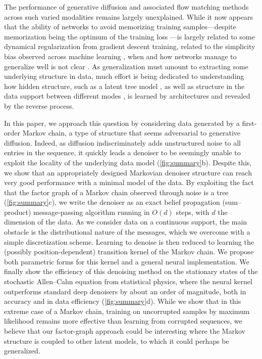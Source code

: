 \documentclass{article}
\begin{document}
The performance of generative diffusion and associated flow matching methods across such varied modalities remains
largely unexplained. While it now appears that the ability of networks to avoid memorizing training samples---despite
memorization being the optimum of the training loss \cite{gu2023memorization}---is largely related to some dynamical
regularization from gradient descent training, related to the simplicity bias observed across machine learning
\cite{bonnaire2025memorize,favero2025bigger}, when and how networks manage to generalize well is not clear
. As generalization must amount to extracting some underlying structure in data, much
effort is being dedicated to understanding how hidden structure, such as a latent tree model
\cite{sclocchi2025phase,garnierbrun2024transformers,mei2024unets}, as well as structure in the data support between
different modes \cite{biroli2023generative,biroli2024dynamical,achilli2026speciation,garnierbrun2026foam}, is learned by
architectures and revealed by the reverse process.

In this paper, we approach this question by considering data generated by a first-order Markov chain, a type of
structure that seems adversarial to generative diffusion. Indeed, as diffusion indiscriminately adds unstructured noise
to all entries in the sequence, it quickly leads a denoiser to be seemingly unable to exploit the locality of the
underlying data model (\cref{fig:summary}b). Despite this, we show that an appropriately designed Markovian denoiser
structure can reach very good performance with a minimal model of the data. By exploiting the fact that the factor
graph of a Markov chain observed through noise is a tree (\cref{fig:summary}c), we write the denoiser as an exact belief
propagation (sum--product) message-passing algorithm running in $O(d)$ steps, with $d$ the dimension of the data. As we
consider data on a continuous support, the main obstacle is the distributional nature of the messages, which we overcome
with a simple discretization scheme. Learning to denoise is then reduced to learning the (possibly position-dependent)
transition kernel of the Markov chain. We propose both parametric forms for this kernel and a general neural
implementation. We finally show the efficiency of this denoising method on the stationary states of the stochastic
Allen--Cahn equation from statistical physics, where the neural kernel outperforms standard deep denoisers by about an
order of magnitude, both in accuracy and in data efficiency (\cref{fig:summary}d). While we show that in this extreme
case of a Markov chain, training on uncorrupted samples by maximum likelihood remains more effective than learning from
corrupted sequences, we believe that our factor-graph approach could be interesting where the Markov structure is
coupled to other latent models, to which it could perhaps be generalized.
\end{document}
